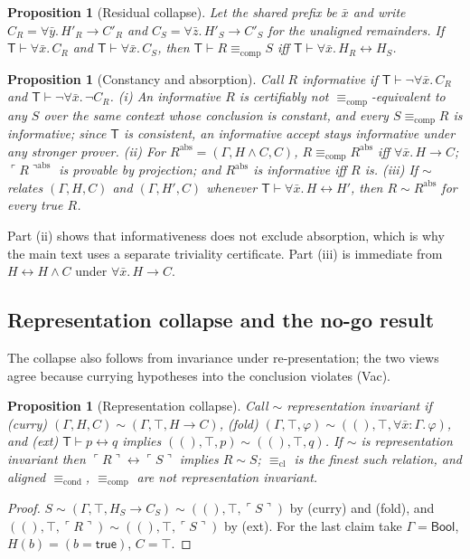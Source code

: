 \documentclass[10pt]{article}
\newtheorem{proposition}[theorem]{Proposition}
\theoremstyle{definition}
\newcommand{\T}{\mathsf{T}}
\newcommand{\Cl}[1]{\ulcorner #1 \urcorner}
\newcommand{\Ecl}{\mathrel{\equiv_{\mathrm{cl}}}}
\newcommand{\Econd}{\mathrel{\equiv_{\mathrm{cond}}}}
\newcommand{\Ecomp}{\mathrel{\equiv_{\mathrm{comp}}}}
\begin{document}
\begin{proposition}[Residual collapse]\label{prop:residue}
Let the shared prefix be $\bar x$ and write $C_R=\forall\bar y.\,H'_R\to C'_R$ and
$C_S=\forall\bar z.\,H'_S\to C'_S$ for the unaligned remainders. If $\T\vdash\forall\bar x.\,C_R$ and
$\T\vdash\forall\bar x.\,C_S$, then $\T\vdash R\Ecomp S$ iff $\T\vdash\forall\bar x.\,H_R\leftrightarrow H_S$.
\end{proposition}

\begin{proposition}[Constancy and absorption]\label{prop:informative}
Call $R$ \emph{informative} if $\T\vdash\neg\forall\bar x.\,C_R$ and $\T\vdash\neg\forall\bar x.\,\neg C_R$.
(i) An informative $R$ is certifiably not $\Ecomp$-equivalent to any $S$ over the same context whose
conclusion is constant, and every $S\Ecomp R$ is informative; since $\T$ is consistent, an
informative accept stays informative under any stronger prover. (ii) For
$R^{\mathrm{abs}}=(\Gamma,H\wedge C,C)$, $R\Ecomp R^{\mathrm{abs}}$ iff $\forall\bar x.\,H\to C$;
$\Cl R^{\mathrm{abs}}$ is provable by projection; and $R^{\mathrm{abs}}$ is informative iff $R$ is.
(iii) If $\sim$ relates $(\Gamma,H,C)$ and $(\Gamma,H',C)$ whenever $\T\vdash\forall\bar x.\,H\leftrightarrow H'$,
then $R\sim R^{\mathrm{abs}}$ for every true $R$.
\end{proposition}
Part (ii) shows that informativeness does not exclude absorption, which is why the main text
uses a separate triviality certificate. Part (iii) is immediate from $H\leftrightarrow H\wedge C$ under
$\forall\bar x.\,H\to C$.

\subsection{Representation collapse and the no-go result}

The collapse also follows from invariance under re-presentation; the two views agree because
currying hypotheses into the conclusion violates (Vac).

\begin{proposition}[Representation collapse]\label{thm:repr}
Call $\sim$ representation invariant if
(curry) $(\Gamma,H,C)\sim(\Gamma,\top,H\to C)$,
(fold) $(\Gamma,\top,\varphi)\sim((),\top,\forall\bar x{:}\Gamma.\,\varphi)$, and
(ext) $\T\vdash p\leftrightarrow q$ implies $((),\top,p)\sim((),\top,q)$.
If $\sim$ is representation invariant then $\Cl R\leftrightarrow\Cl S$ implies $R\sim S$;
$\Ecl$ is the finest such relation, and aligned $\Econd$, $\Ecomp$ are not representation
invariant.
\end{proposition}
\begin{proof}
$S\sim(\Gamma,\top,H_S\to C_S)\sim((),\top,\Cl S)$ by (curry) and (fold), and
$((),\top,\Cl R)\sim((),\top,\Cl S)$ by (ext). For the last claim take $\Gamma=\mathsf{Bool}$,
$H(b)=(b=\mathsf{true})$, $C=\top$.
\end{proof}
\end{document}
